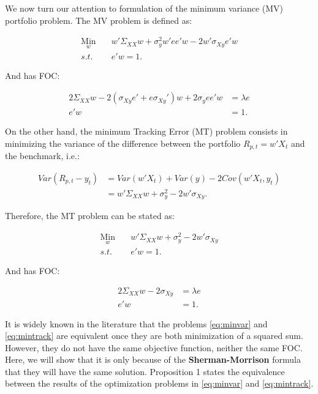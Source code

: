 \documentclass[12pt,oneside,a4paper]{memoir}
\begin{document}
We now turn our attention to formulation of the minimum variance (MV) portfolio problem. The MV problem is defined as:

\vspace{-18 pt}
\begin{align}\label{eq:minvar}
\underset{w}{\text{Min}} \quad &
w'\Sigma_{XX}w + \sigma^{2}_{y}w'ee'w - 2w'\sigma_{Xy}e'w
\\
s.t. \quad &
e'w = 1.\nonumber
\end{align}

\noindent
And has FOC:

\vspace{-18 pt}
\begin{align*}
	2 \Sigma_{XX} w - 2(\sigma_{Xy}e' + e \sigma_{Xy}')w + 2 \sigma_{y}ee'w &= \lambda e
\\
e'w &= 1.
\end{align*}

On the other hand, the minimum Tracking Error (MT) problem consists in minimizing the variance of the difference between the portfolio $R_{p,t}=w'X_{t}$ and the benchmark, i.e.:

\vspace{-18 pt}
\begin{align*}
Var(R_{p,t} - y_{t}) 
&= Var(w'X_{t}) + Var(y) - 2Cov(w'X_{t}, y_{t})
\\
&= w'\Sigma_{XX}w + \sigma_{y}^{2} - 2w'\sigma_{Xy}.
\end{align*}

\noindent
Therefore, the MT problem can be stated as:

\vspace{-18 pt}
\begin{align}\label{eq:mintrack}
\underset{w}{\text{Min}} \quad & w'\Sigma_{XX}w + \sigma_{y}^{2} - 2w'\sigma_{Xy} 
\\
s.t. \quad &
e'w = 1. \nonumber
\end{align}

\noindent
And has FOC:

\vspace{-18 pt}
\begin{align*}
2 \Sigma_{XX} w - 2 \sigma_{Xy} &= \lambda e
\\
e'w &= 1.
\end{align*}

It is widely known in the literature \cite{ckl99, liu-2009, brodie2009, demol2016} that the problems \eqref{eq:minvar} and \eqref{eq:mintrack} are equivalent once they are both minimization of a squared sum.
However, they do not have the same objective function, neither the same FOC.
Here, we will show that it is only because of the \textbf{Sherman-Morrison} formula \cite{matcook2012} that they will have the same solution.
Proposition 1 states the equivalence between the results of the optimization problems in \eqref{eq:minvar} and \eqref{eq:mintrack}.\\
\end{document}
